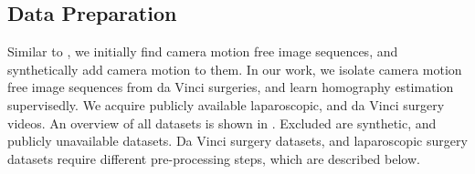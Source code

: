 
\subsection{Data Preparation}

Similar to \cite{le2020deep}, we initially find camera motion free image sequences, and synthetically add camera motion to them. In our work, we isolate camera motion free image sequences from da Vinci surgeries, and learn homography estimation supervisedly. We acquire publicly available laparoscopic, and da Vinci surgery videos. An overview of all datasets is shown in . Excluded are synthetic, and publicly unavailable datasets. Da Vinci surgery datasets, and laparoscopic surgery datasets require different pre-processing steps, which are described below.

